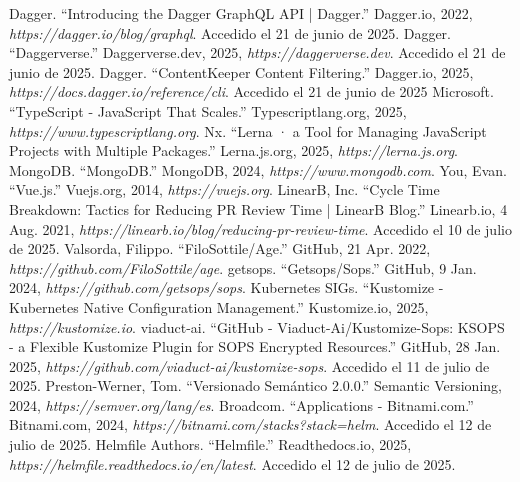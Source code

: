 \begin{thebibliography}{99}
 Dagger. ``Introducing the Dagger GraphQL API | Dagger.'' Dagger.io, 2022, {\it https://dagger.io/blog/graphql}. Accedido el 21 de junio de 2025.
 Dagger. ``Daggerverse.'' Daggerverse.dev, 2025, {\it https://daggerverse.dev}. Accedido el 21 de junio de 2025.
 Dagger. ``ContentKeeper Content Filtering.'' Dagger.io, 2025, {\it https://docs.dagger.io/reference/cli}. Accedido el 21 de junio de 2025
 Microsoft. ``TypeScript - JavaScript That Scales.'' Typescriptlang.org, 2025, {\it https://www.typescriptlang.org}.
 Nx. ``Lerna · a Tool for Managing JavaScript Projects with Multiple Packages.'' Lerna.js.org, 2025, {\it https://lerna.js.org}.
 MongoDB. ``MongoDB.'' MongoDB, 2024, {\it https://www.mongodb.com}.
 You, Evan. ``Vue.js.'' Vuejs.org, 2014, {\it https://vuejs.org}.
 LinearB, Inc. ``Cycle Time Breakdown: Tactics for Reducing PR Review Time | LinearB Blog.'' Linearb.io, 4 Aug. 2021, {\it https://linearb.io/blog/reducing-pr-review-time}. Accedido el 10 de julio de 2025.
 Valsorda, Filippo. ``FiloSottile/Age.'' GitHub, 21 Apr. 2022, {\it https://github.com/FiloSottile/age}.
 getsops. ``Getsops/Sops.'' GitHub, 9 Jan. 2024, {\it https://github.com/getsops/sops}.
 Kubernetes SIGs. ``Kustomize - Kubernetes Native Configuration Management.'' Kustomize.io, 2025, {\it https://kustomize.io}.
 viaduct-ai. ``GitHub - Viaduct-Ai/Kustomize-Sops: KSOPS - a Flexible Kustomize Plugin for SOPS Encrypted Resources.'' GitHub, 28 Jan. 2025, {\it https://github.com/viaduct-ai/kustomize-sops}. Accedido el 11 de julio de 2025.
 Preston-Werner, Tom. ``Versionado Semántico 2.0.0.'' Semantic Versioning, 2024, {\it https://semver.org/lang/es}.
 Broadcom. ``Applications - Bitnami.com.'' Bitnami.com, 2024, {\it https://bitnami.com/stacks?stack=helm}. Accedido el 12 de julio de 2025.
 Helmfile Authors. ``Helmfile.'' Readthedocs.io, 2025, {\it https://helmfile.readthedocs.io/en/latest}. Accedido el 12 de julio de 2025.
\end{thebibliography}

